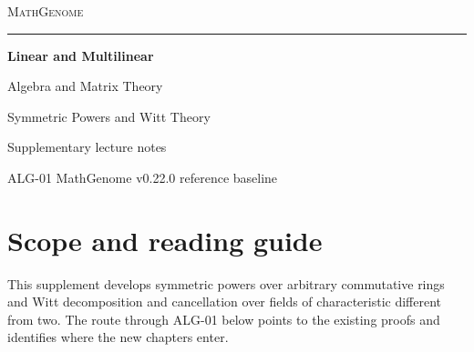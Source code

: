 \documentclass[11pt,oneside,openany]{book}
\theoremstyle{definition}
\theoremstyle{remark}
\begin{document}
\frontmatter
\hypersetup{pageanchor=false}
\begin{titlepage}
  \thispagestyle{empty}
  \begin{flushleft}
    \vspace*{0.65in}
    {\large\scshape\color{deepgreen}MathGenome\par}
    \vspace{0.32in}
    {\color{rulegreen}\rule{0.94\textwidth}{0.65pt}\par}
    \vspace{0.45in}
    {\color{ink}\fontsize{34}{39}\selectfont\bfseries
       Linear and Multilinear\par Algebra and Matrix Theory\par}
    \vspace{0.30in}
    {\color{deepgreen}\Large
       Symmetric Powers and Witt Theory\par}
    \vfill
    {\large Supplementary lecture notes\par}
    \vspace{0.12in}
    {\normalsize ALG-01 \enspace\textperiodcentered\enspace MathGenome v0.22.0 reference baseline\par}
    \vspace*{0.48in}
  \end{flushleft}
\end{titlepage}
\hypersetup{pageanchor=true}
{\small\tableofcontents}
\chapter*{Scope and reading guide}

This supplement develops symmetric powers over arbitrary commutative
rings and Witt decomposition and cancellation over fields of
characteristic different from two. The route through ALG-01 below
points to the existing proofs and identifies where the new chapters
enter.

{\setlength{\fboxsep}{0.8em}\setlength{\fboxrule}{0.35pt}%
\noindent{}\par}
\end{document}
